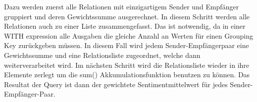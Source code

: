
Dazu werden zuerst alle Relationen mit einzigartigem Sender und Empfänger gruppiert und deren Gewichtssumme ausgerechnet. In diesem Schritt werden alle Relationen auch zu einer Liste zusammengefasst. Das ist notwendig, da in einer WITH expression alle Ausgaben die gleiche Anzahl an Werten für einen Grouping Key zurückgeben müssen. In diesem Fall wird jedem Sender-Empfängerpaar eine Gewichtssumme und eine Relationsliste zugeordnet, welche dann weiterverarbeitet wird. Im nächsten Schritt wird die Relationsliste wieder in ihre Elemente zerlegt um die sum() Akkumulationsfunktion benutzen zu können. Das Resultat der Query ist dann der gewichtete Sentimentmittelwert für jedes Sender-Empfänger-Paar.


